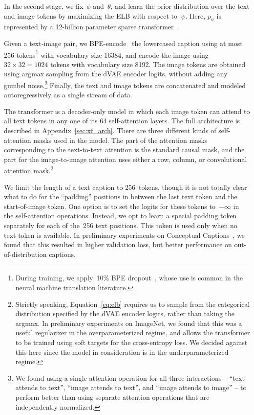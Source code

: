 In the second stage, we fix~$\phi$ and~$\theta$, and learn the prior distribution over the text and image tokens by maximizing the ELB with respect to~$\psi$. Here, $p_\psi$ is represented by a 12-billion parameter sparse transformer~\cite{child2019generating}.

Given a text-image pair, we BPE-encode~\cite{sennrich2015neural} the lowercased caption using at most 256 tokens\footnote{During training, we apply~10\% BPE dropout~\cite{provilkov2019bpe}, whose use is common in the neural machine translation literature.} with vocabulary size \num{16384}, and encode the image using $32 \times 32 = 1024$ tokens with vocabulary size \num{8192}. The image tokens are obtained using argmax sampling from the dVAE encoder logits, without adding any gumbel noise.\footnote{Strictly speaking, Equation~\ref{eq:elb} requires us to sample from the categorical distribution specified by the dVAE encoder logits, rather than taking the argmax. In preliminary experiments on ImageNet, we found that this was a useful regularizer in the overparameterized regime, and allows the transformer to be trained using soft targets for the cross-entropy loss. We decided against this here since the model in consideration is in the underparameterized regime.} Finally, the text and image tokens are concatenated and modeled autoregressively as a single stream of data.

The transformer is a decoder-only model in which each image token can attend to all text tokens in any one of its 64 self-attention layers. The full architecture is described in Appendix~\ref{sec:xf_arch}. There are three different kinds of self-attention masks used in the model. The part of the attention masks corresponding to the text-to-text attention is the standard causal mask, and the part for the image-to-image attention uses either a row, column, or convolutional attention mask.\footnote{We found using a single attention operation for all three interactions -- ``text attends to text'', ``image attends to text'', and ``image attends to image'' -- to perform better than using separate attention operations that are independently normalized.} 

We limit the length of a text caption to 256~tokens, though it is not totally clear what to do for the ``padding'' positions in between the last text token and the start-of-image token. One option is to set the logits for these tokens to~$-\infty$ in the self-attention operations. Instead, we opt to learn a special padding token separately for each of the~256 text positions. This token is used only when no text token is available. In preliminary experiments on Conceptual Captions~\cite{sharma2018conceptual}, we found that this resulted in higher validation loss, but better performance on out-of-distribution captions.


